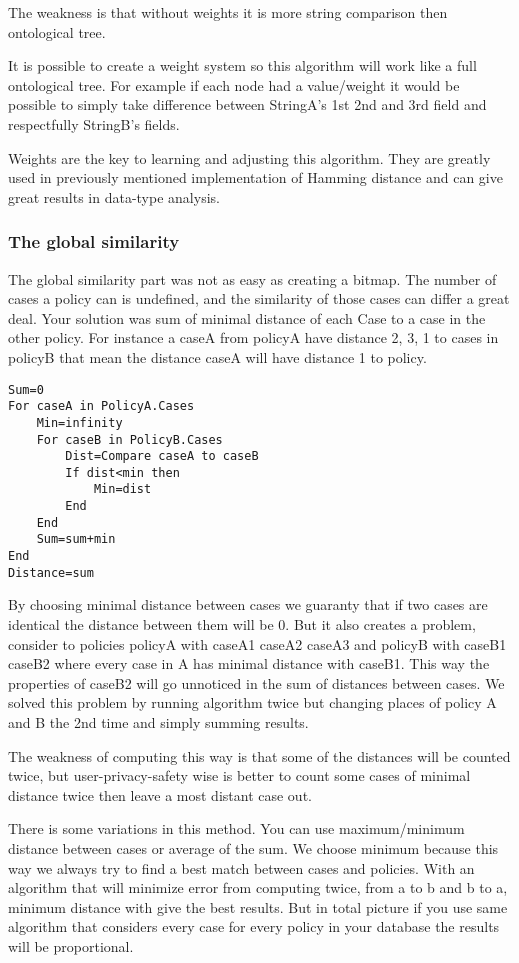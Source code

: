 The weakness is that without weights it is more string comparison then ontological tree.

It is possible to create a weight system so this algorithm will work like a full ontological tree. For example if each node had a value/weight it would be possible to simply take difference between StringA’s 1st 2nd and 3rd field and respectfully StringB’s fields.
 
Weights are the key to learning and adjusting this algorithm. They are greatly used in previously mentioned implementation of Hamming distance and can give great results in data-type analysis.

\subsubsection{ The global similarity }
The global similarity part was not as easy as creating a bitmap. The number of cases a policy can is undefined, and the similarity of those cases can differ a great deal. Your solution was sum of minimal distance of each Case to a case in the other policy. For instance a caseA from policyA have distance 2, 3, 1 to cases in policyB that mean the distance caseA will have distance 1 to policy. 

\begin{verbatim}
Sum=0
For caseA in PolicyA.Cases
	Min=infinity
	For caseB in PolicyB.Cases
		Dist=Compare caseA to caseB
		If dist<min then
			Min=dist
		End
	End
	Sum=sum+min
End
Distance=sum

\end{verbatim}
 

By choosing minimal distance between cases we guaranty that if two cases are identical the distance between them will be 0. But it also creates a problem, consider to policies policyA with {caseA1 caseA2 caseA3} and policyB with {caseB1 caseB2} where every case in A has minimal distance with caseB1. This way the properties of caseB2 will go unnoticed in the sum of distances between cases. We solved this problem by running algorithm twice but changing places of policy A and B the 2nd time and simply summing results.

The weakness of computing this way is that some of the distances will be counted twice, but user-privacy-safety wise is better to count some cases of minimal distance twice then leave a most distant case out.

There is some variations in this method. You can use maximum/minimum distance between cases or average of the sum. We choose minimum because this way we always try to find a best match between cases and policies. With an algorithm that will minimize error from computing twice, from a to b and b to a, minimum distance with give the best results. But in total picture if you use same algorithm that considers every case for every policy in your database the results will be proportional.




